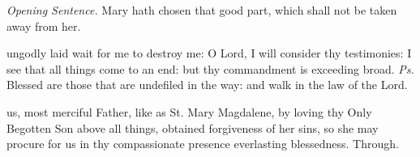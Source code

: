 \clearpage
\par\noindent
\textit{Opening Sentence.} Mary hath chosen that good part, which shall not be taken away from her.

\vspace{-0.2\baselineskip}

\introit

\vspace{-0.1\baselineskip}

 ungodly laid wait for me to destroy me: O Lord, I will consider thy testimonies: I see that all things come to an end: but thy commandment is exceeding broad. \textit{Ps.} Blessed are those that are undefiled in the way: and walk in the law of the Lord.

\vspace{-0.2\baselineskip}

\collect

\vspace{-0.1\baselineskip}

 us, most merciful Father, like as St. Mary Magdalene, by loving thy Only Begotten Son above all things, obtained forgiveness of her sins, so she may procure for us in thy compassionate presence everlasting blessedness. Through.

\vspace{-0.25\baselineskip}

